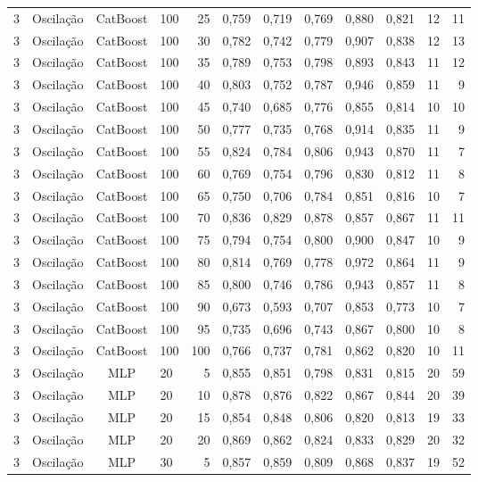 \begin{longtable}{ccclrrrrrrrr}
3 & Oscilação & CatBoost & 100 & 25 & 0,759 & 0,719 & 0,769 & 0,880 & 0,821 & 12 & 11 \\
3 & Oscilação & CatBoost & 100 & 30 & 0,782 & 0,742 & 0,779 & 0,907 & 0,838 & 12 & 13 \\
3 & Oscilação & CatBoost & 100 & 35 & 0,789 & 0,753 & 0,798 & 0,893 & 0,843 & 11 & 12 \\
3 & Oscilação & CatBoost & 100 & 40 & 0,803 & 0,752 & 0,787 & 0,946 & 0,859 & 11 & 9 \\
3 & Oscilação & CatBoost & 100 & 45 & 0,740 & 0,685 & 0,776 & 0,855 & 0,814 & 10 & 10 \\
3 & Oscilação & CatBoost & 100 & 50 & 0,777 & 0,735 & 0,768 & 0,914 & 0,835 & 11 & 9 \\
3 & Oscilação & CatBoost & 100 & 55 & 0,824 & 0,784 & 0,806 & 0,943 & 0,870 & 11 & 7 \\
3 & Oscilação & CatBoost & 100 & 60 & 0,769 & 0,754 & 0,796 & 0,830 & 0,812 & 11 & 8 \\
3 & Oscilação & CatBoost & 100 & 65 & 0,750 & 0,706 & 0,784 & 0,851 & 0,816 & 10 & 7 \\
3 & Oscilação & CatBoost & 100 & 70 & 0,836 & 0,829 & 0,878 & 0,857 & 0,867 & 11 & 11 \\
3 & Oscilação & CatBoost & 100 & 75 & 0,794 & 0,754 & 0,800 & 0,900 & 0,847 & 10 & 9 \\
3 & Oscilação & CatBoost & 100 & 80 & 0,814 & 0,769 & 0,778 & 0,972 & 0,864 & 11 & 9 \\
3 & Oscilação & CatBoost & 100 & 85 & 0,800 & 0,746 & 0,786 & 0,943 & 0,857 & 11 & 8 \\
3 & Oscilação & CatBoost & 100 & 90 & 0,673 & 0,593 & 0,707 & 0,853 & 0,773 & 10 & 7 \\
3 & Oscilação & CatBoost & 100 & 95 & 0,735 & 0,696 & 0,743 & 0,867 & 0,800 & 10 & 8 \\
3 & Oscilação & CatBoost & 100 & 100 & 0,766 & 0,737 & 0,781 & 0,862 & 0,820 & 10 & 11 \\
3 & Oscilação & MLP & 20 & 5 & 0,855 & 0,851 & 0,798 & 0,831 & 0,815 & 20 & 59 \\
3 & Oscilação & MLP & 20 & 10 & 0,878 & 0,876 & 0,822 & 0,867 & 0,844 & 20 & 39 \\
3 & Oscilação & MLP & 20 & 15 & 0,854 & 0,848 & 0,806 & 0,820 & 0,813 & 19 & 33 \\
3 & Oscilação & MLP & 20 & 20 & 0,869 & 0,862 & 0,824 & 0,833 & 0,829 & 20 & 32 \\
3 & Oscilação & MLP & 30 & 5 & 0,857 & 0,859 & 0,809 & 0,868 & 0,837 & 19 & 52 \\

\end{longtable}
